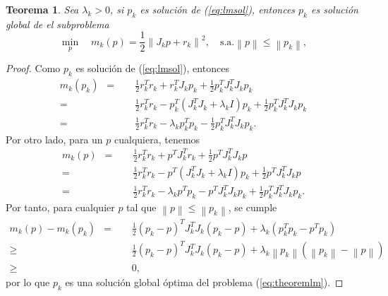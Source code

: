 \documentclass[11pt,a4paper]{book}
\newtheorem{theorem}{Teorema}[chapter]
\theoremstyle{definition}
\theoremstyle{remark}
\newcommand{\norm}[1]{\left\lVert#1\right\rVert}
\begin{document}
\begin{theorem}
	Sea $\lambda_k>0$, si $p_k$ es solución de (\ref{eq:lmsol}), entonces $p_k$ es solución global de el subproblema
\begin{equation}
\label{eq:theoremlm}
\min_{p} \quad m_k(p)=\frac{1}{2} \norm{J_kp+r_k}^2,\quad \text{s.a.} \norm{p} \leq \norm{p_k},
\end{equation}
\end{theorem}
\begin{proof}
	Como $p_k$ es solución de (\ref{eq:lmsol}), entonces
\begin{equation}
\begin{split}
	m_k(p_k)\enspace
	=&\quad \frac{1}{2}r_k^Tr_k+r_k^TJ_kp_k+\frac{1}{2}p_k^TJ_k^TJ_kp_k \\
	=&\quad \frac{1}{2}r_k^Tr_k-p_k^T(J_k^TJ_k+\lambda_kI)p_k+
										\frac{1}{2}p_k^TJ_k^TJ_kp_k \\
	=&\quad \frac{1}{2}r_k^Tr_k-\lambda_kp_k^Tp_k-
										\frac{1}{2}p_k^TJ_k^TJ_kp_k.
\end{split}
\end{equation}
Por otro lado, para un $p$ cualquiera, tenemos
\begin{equation}
\begin{split}
	m_k(p)\enspace
	=&\quad \frac{1}{2}r_k^Tr_k+p^TJ_k^Tr_k+\frac{1}{2}p^TJ_k^TJ_kp \\
	=&\quad \frac{1}{2}r_k^Tr_k-p^T(J_k^TJ_k+\lambda_kI)p_k+
										\frac{1}{2}p^TJ_k^TJ_kp \\
	=&\quad \frac{1}{2}r_k^Tr_k-\lambda_kp^Tp_k
				-p^TJ_k^TJ_kp_k
										+\frac{1}{2}p_k^TJ_k^TJ_kp_k.
\end{split}
\end{equation}
Por tanto, para cualquier $p$ tal que $\norm{p} \leq \norm{p_k}$, se cumple
\begin{equation}
\begin{split}
	m_k(p) - m_k(p_k) \enspace
	=&\quad\frac{1}{2}(p_k-p)^TJ_k^TJ_k(p_k-p) + \lambda_k(p_k^Tp_k-p^Tp_k) \\
	\geq&\quad \frac{1}{2}(p_k-p)^TJ_k^TJ_k(p_k-p)+
									\lambda_k\norm{p_k}(\norm{p_k}-\norm{p}) \\
	\geq&\quad 0,
\end{split}
\end{equation}
por lo que $p_k$ es una solución global óptima del problema (\ref{eq:theoremlm}).
\end{proof}
\end{document}
